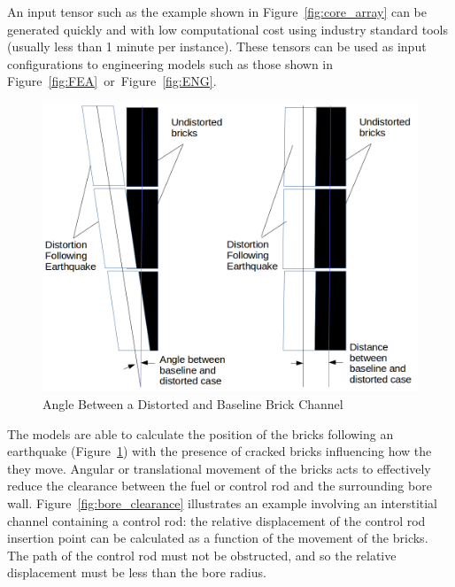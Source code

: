 \noindent
An input tensor such as the example shown in Figure~\ref{fig:core_array} can be generated quickly and with low computational cost using industry standard tools (usually less than 1 minute per instance). These tensors can be used as input configurations to engineering models such as those shown in Figure~\ref{fig:FEA}~or~Figure~\ref{fig:ENG}. \\

\begin{figure}[ht!]
	\centering
	\includegraphics[scale=0.2]{Figures/Distored_bricks}
	\caption{Angle Between a Distorted and Baseline Brick Channel }
	\label{fig:angles}
\end{figure}


\noindent
The models are able to calculate the position of the bricks following an earthquake (Figure~\ref{fig:angles}) with the presence of cracked bricks influencing how the they move. Angular or translational movement of the bricks acts to effectively reduce the clearance between the fuel or control rod and the surrounding bore wall. Figure~\ref{fig:bore_clearance} illustrates an example involving an interstitial channel containing a control rod: the relative displacement of the control rod insertion point can be calculated as a function of the movement of the bricks. The path of the control rod must not be obstructed, and so the relative displacement must be less than the bore radius. \\

